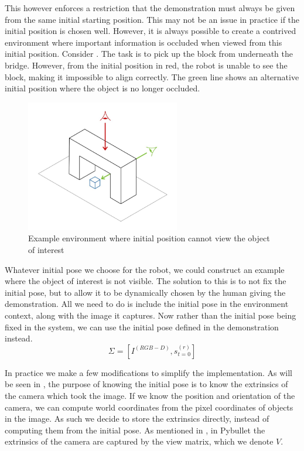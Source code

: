 This however enforces a restriction that the demonstration must always be given from the same initial starting position. This may not be an issue in practice if the initial position is chosen well. However, it is always possible to create a contrived environment where important information is occluded when viewed from this initial position. Consider . The task is to pick up the block from underneath the bridge. However, from the initial position in red, the robot is unable to see the block, making it impossible to align correctly. The green line shows an alternative initial position where the object is no longer occluded.\\

\begin{figure}[h]
    \centering
    \includegraphics[width=0.6\textwidth]{figures/occluded-no-bg.jpg}
    \caption{Example environment where initial position cannot view the object of interest}
    \label{fig:occluded}
\end{figure}

Whatever initial pose we choose for the robot, we could construct an example where the object of interest is not visible. The solution to this is to not fix the initial pose, but to allow it to be dynamically chosen by the human giving the demonstration. All we need to do is include the initial pose in the environment context, along with the image it captures. Now rather than the initial pose being fixed in the system, we can use the initial pose defined in the demonstration instead.
$$\Sigma = [I^{(RGB-D)}, s^{(r)}_{t=0}]$$

In practice we make a few modifications to simplify the implementation. As will be seen in , the purpose of knowing the initial pose is to know the extrinsics of the camera which took the image. If we know the position and orientation of the camera, we can compute world coordinates from the pixel coordinates of objects in the image. As such we decide to store the extrinsics directly, instead of computing them from the initial pose. As mentioned in , in Pybullet the extrinsics of the camera are captured by the view matrix, which we denote $V$.\\

